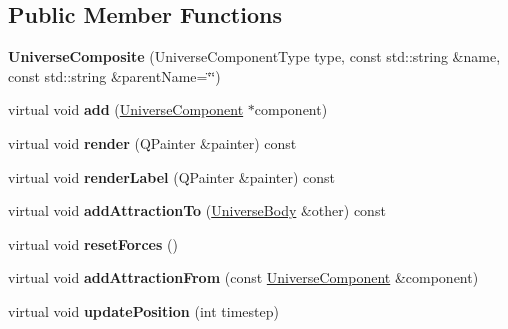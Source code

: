 \subsection*{Public Member Functions}
\begin{DoxyCompactItemize}
\item 
{\bfseries Universe\+Composite} (Universe\+Component\+Type type, const std\+::string \&name, const std\+::string \&parent\+Name=\char`\"{}\char`\"{})\hypertarget{classUniverseComposite_a1d502725a50d0bb57fc82dd26af04404}{}\label{classUniverseComposite_a1d502725a50d0bb57fc82dd26af04404}

\item 
virtual void {\bfseries add} (\hyperlink{classUniverseComponent}{Universe\+Component} $\ast$component)\hypertarget{classUniverseComposite_a688fc563c75b5409694b87b3e93f536f}{}\label{classUniverseComposite_a688fc563c75b5409694b87b3e93f536f}

\item 
virtual void {\bfseries render} (Q\+Painter \&painter) const\hypertarget{classUniverseComposite_a6d4cc7a4d02f3a0caedc13da32478add}{}\label{classUniverseComposite_a6d4cc7a4d02f3a0caedc13da32478add}

\item 
virtual void {\bfseries render\+Label} (Q\+Painter \&painter) const\hypertarget{classUniverseComposite_a288713a094824e0bea8f66fa81e9735b}{}\label{classUniverseComposite_a288713a094824e0bea8f66fa81e9735b}

\item 
virtual void {\bfseries add\+Attraction\+To} (\hyperlink{classUniverseBody}{Universe\+Body} \&other) const\hypertarget{classUniverseComposite_af31da7bdf116c0842b8688d03798e032}{}\label{classUniverseComposite_af31da7bdf116c0842b8688d03798e032}

\item 
virtual void {\bfseries reset\+Forces} ()\hypertarget{classUniverseComposite_a2129af893c2246c195885d33ad35b3f8}{}\label{classUniverseComposite_a2129af893c2246c195885d33ad35b3f8}

\item 
virtual void {\bfseries add\+Attraction\+From} (const \hyperlink{classUniverseComponent}{Universe\+Component} \&component)\hypertarget{classUniverseComposite_a693ebf330331eb02aee9a899a6ed9931}{}\label{classUniverseComposite_a693ebf330331eb02aee9a899a6ed9931}

\item 
virtual void {\bfseries update\+Position} (int timestep)\hypertarget{classUniverseComposite_a06dcff451e2dfc3886555593a2e462d2}{}\label{classUniverseComposite_a06dcff451e2dfc3886555593a2e462d2}


\end{DoxyCompactItemize}
